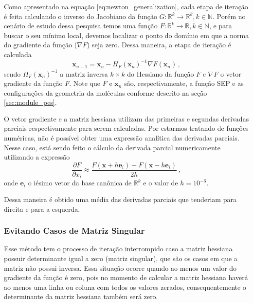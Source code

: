 Como apresentado na equação \eqref{eq:newton_generalization}, cada etapa de iteração é feita calculando o inverso do Jacobiano da função $G: {\mathds{R}^k\to\mathds{R}^k}, k \in \mathds{N}$. Porém no cenário de estudo dessa pesquisa temos uma função $F: {\mathds{R}^k\to\mathds{R}}, k \in \mathds{N}$, e para buscar o seu mínimo local, devemos localizar o ponto do domínio em que a norma do gradiente da função ($\nabla F$) seja zero. Dessa maneira, a etapa de iteração é calculada
%
\begin{equation}
  \mathbf{x}_{n+1} = \mathbf{x}_n - H_F(\mathbf{x}_n)^{-1} \nabla F(\mathbf{x}_n) \,,
\end{equation}
%
sendo $H_F(\mathbf{x}_n)^{-1}$ a matriz inversa $k \times k$ do Hessiano da função $F$ e $\nabla F$ o vetor gradiente da função $F$. Note que $F$ e $\mathbf{x}_n$ são, respectivamente, a função SEP e as configurações da geometria da moléculas conforme descrito na seção \ref{sec:module_pes}. 

O vetor gradiente e a matriz hessiana utilizam das primeiras e segundas derivadas parciais respectivamente para serem calculadas. Por estarmos tratando de funções numéricas, não é possível obter uma expressão analítica das derivadas parciais. Nesse caso, está sendo feito o cálculo da derivada parcial numericamente utilizando a expressão
%
\begin{equation}
  \label{eq:partial_derivative}
  \frac{\partial F}{\partial x_i} \approx \frac{F(\mathbf{x}+h \mathbf{e}_i) - F(\mathbf{x}-h \mathbf{e}_i)}{2h} \,,
\end{equation}
%
onde $\mathbf{e}_i$ o iésimo vetor da base canônica de $\mathds{R}^k$ e o valor de $h = 10^{-6}$.

Dessa maneira é obtido uma média das derivadas parciais que tenderiam para direita e para a esquerda.

\subsubsection{Evitando Casos de Matriz Singular}

Esse método tem o processo de iteração interrompido caso a matriz hessiana possuir determinante igual a zero (matriz singular), que são os casos em que a matriz não possui inversa. Essa situação ocorre quando ao menos um valor do gradiente da função é zero, pois no momento de calcular a matriz hessiana haverá ao menos uma linha ou coluna com todos os valores zerados, consequentemente o determinante da matriz hessiana também será zero.

